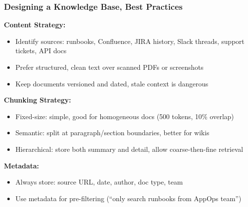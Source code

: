 \begin{frame}[fragile]\frametitle{Designing a Knowledge Base, Best Practices}
\textbf{Content Strategy:}
\begin{itemize}
\item Identify sources: runbooks, Confluence, JIRA history, Slack threads, support tickets, API docs
\item Prefer structured, clean text over scanned PDFs or screenshots
\item Keep documents versioned and dated, stale context is dangerous
\end{itemize}

\textbf{Chunking Strategy:}
\begin{itemize}
\item Fixed-size: simple, good for homogeneous docs (500 tokens, 10\% overlap)
\item Semantic: split at paragraph/section boundaries, better for wikis
\item Hierarchical: store both summary and detail, allow coarse-then-fine retrieval
\end{itemize}

\textbf{Metadata:}
\begin{itemize}
\item Always store: source URL, date, author, doc type, team
\item Use metadata for pre-filtering (``only search runbooks from AppOps team'')
\end{itemize}
\end{frame}


